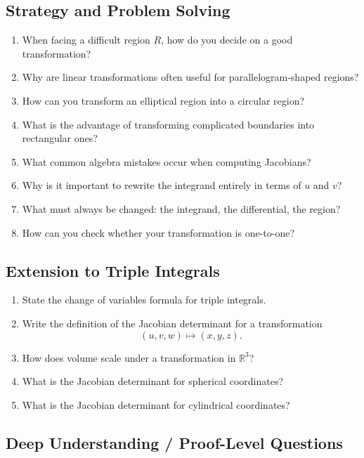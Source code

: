 \subsection{Strategy and Problem Solving}

\begin{enumerate}[resume]
  \item When facing a difficult region $R$, how do you decide on a good transformation?
  \item Why are linear transformations often useful for parallelogram-shaped regions?
  \item How can you transform an elliptical region into a circular region?
  \item What is the advantage of transforming complicated boundaries into rectangular ones?
  \item What common algebra mistakes occur when computing Jacobians?
  \item Why is it important to rewrite the integrand entirely in terms of $u$ and $v$?
  \item What must always be changed: the integrand, the differential, the region?
  \item How can you check whether your transformation is one-to-one?
\end{enumerate}

\subsection{Extension to Triple Integrals}

\begin{enumerate}[resume]
  \item State the change of variables formula for triple integrals.
  \item Write the definition of the Jacobian determinant for a transformation
    \[
      (u,v,w) \mapsto (x,y,z).
    \]
  \item How does volume scale under a transformation in $\mathbb{R}^3$?
  \item What is the Jacobian determinant for spherical coordinates?
  \item What is the Jacobian determinant for cylindrical coordinates?
\end{enumerate}

\subsection{Deep Understanding / Proof-Level Questions}

